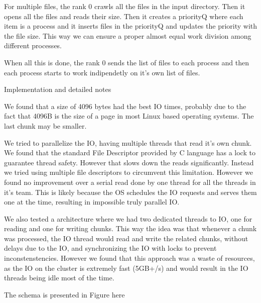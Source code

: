 For multiple files, the rank 0 crawls all the files in the input directory. Then it opens all the files and reads their size. Then it creates a priorityQ where each item is a process and it inserts files in the priorityQ and updates the priority with the file size. This way we can ensure a proper almost equal work division among different processes.

When all this is done, the rank 0 sends the list of files to each process and then each process starts to work indipendetly on it's own list of files.


Implementation and detailed notes

We found that a size of 4096 bytes had  the best IO times, probably due to the fact that 4096B is the size of a page in most Linux based operating systems. The last chunk may be smaller.

We tried to parallelize the IO, having multiple threads that read it's own chunk. We found that the standard File Descriptor provided by C language has a lock to guarantee thread safety. However that slows down the reads significantly. Instead we tried using multiple file descriptors to circumvent this limitation. However we found no improvement over a serial read done by one thread for all the threads in it's team. This is likely because the OS schedules the IO requests and serves them one at the time, resulting in impossible truly parallel IO.

We also tested a architecture where we had two dedicated threads to IO, one for reading and one for writing chunks. This way the idea was that whenever a chunk was processed, the IO thread would read and write the related chunks, without delays due to the IO, and synchronizing the IO with locks to prevent inconstenstencies. However we found that this approach was a waste  of resources, as the IO on the cluster is extremely fast (5GB+/s) and would result in the IO threads being idle most of the time.

The schema is presented in Figure here
